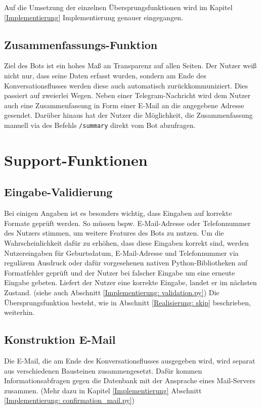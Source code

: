             Auf die Umsetzung der einzelnen Übersprungsfunktionen wird im Kapitel \ref{Implementierung} Implementierung genauer eingegangen.
    
        \subsection{Zusammenfassungs-Funktion}
            Ziel des Bots ist ein hohes Maß an Transparenz auf allen Seiten. Der Nutzer weiß nicht nur, dass seine Daten erfasst wurden, sondern am Ende des Konversationsflusses werden diese auch automatisch zurückkommuniziert. Dies passiert auf zweierlei Wegen. Neben einer Telegram-Nachricht wird dem Nutzer auch eine Zusammenfassung in Form einer E-Mail an die angegebene Adresse gesendet. Darüber hinaus hat der Nutzer die Möglichkeit, die Zusammenfassung manuell via des Befehls \verb|/summary| direkt vom Bot abzufragen.            


    \section{Support-Funktionen}
        
        \subsection{Eingabe-Validierung} \label{Realisierung: Validation}
            Bei einigen Angaben ist es besonders wichtig, dass Eingaben auf korrekte Formate geprüft werden. So müssen bspw. E-Mail-Adresse oder Telefonnummer des Nutzers stimmen, um weitere Features des Bots zu nutzen. Um die Wahrscheinlichkeit dafür zu erhöhen, dass diese Eingaben korrekt sind, werden Nutzereingaben für Geburtsdatum, E-Mail-Adresse und Telefonnummer via regulärem Ausdruck oder dafür vorgesehenen nativen Python-Bibliotheken auf Formatfehler geprüft und der Nutzer bei falscher Eingabe um eine erneute Eingabe gebeten. Liefert der Nutzer eine korrekte Eingabe, landet er im nächsten Zustand. (siehe auch Abschnitt \ref*{Implementierung: validation.py}) Die Übersprungsfunktion besteht, wie in Abschnitt \ref*{Realisierung: skip} beschrieben, weiterhin.
        
        \subsection{Konstruktion E-Mail} \label{Realisierung: email}
            Die E-Mail, die am Ende des Konversationsflusses ausgegeben wird, wird separat aus verschiedenen Bausteinen zusammengesetzt. Dafür kommen Informationsabfragen gegen die Datenbank mit der Ansprache eines Mail-Servers zusammen. (Mehr dazu in Kapitel \ref*{Implementierung} Abschnitt \ref*{Implementierung: confirmation_mail.py})
        
